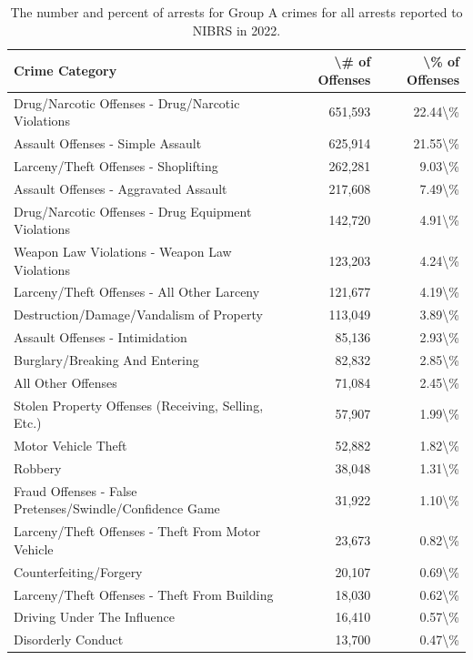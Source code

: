 \documentclass[
  12pt,
  openany]{book}
\begin{document}
\begin{longtable}[t]{lrr}
\caption{\label{tab:arresteeCrime}The number and percent of arrests for Group A crimes for all arrests reported to NIBRS in 2022.}\\
\toprule
Crime Category & \textbackslash{}\# of Offenses & \textbackslash{}\% of Offenses\\
\midrule
Drug/Narcotic Offenses - Drug/Narcotic Violations & 651,593 & 22.44\textbackslash{}\%\\
Assault Offenses - Simple Assault & 625,914 & 21.55\textbackslash{}\%\\
Larceny/Theft Offenses - Shoplifting & 262,281 & 9.03\textbackslash{}\%\\
Assault Offenses - Aggravated Assault & 217,608 & 7.49\textbackslash{}\%\\
Drug/Narcotic Offenses - Drug Equipment Violations & 142,720 & 4.91\textbackslash{}\%\\
\addlinespace
Weapon Law Violations - Weapon Law Violations & 123,203 & 4.24\textbackslash{}\%\\
Larceny/Theft Offenses - All Other Larceny & 121,677 & 4.19\textbackslash{}\%\\
Destruction/Damage/Vandalism of Property & 113,049 & 3.89\textbackslash{}\%\\
Assault Offenses - Intimidation & 85,136 & 2.93\textbackslash{}\%\\
Burglary/Breaking And Entering & 82,832 & 2.85\textbackslash{}\%\\
\addlinespace
All Other Offenses & 71,084 & 2.45\textbackslash{}\%\\
Stolen Property Offenses (Receiving, Selling, Etc.) & 57,907 & 1.99\textbackslash{}\%\\
Motor Vehicle Theft & 52,882 & 1.82\textbackslash{}\%\\
Robbery & 38,048 & 1.31\textbackslash{}\%\\
Fraud Offenses - False Pretenses/Swindle/Confidence Game & 31,922 & 1.10\textbackslash{}\%\\
\addlinespace
Larceny/Theft Offenses - Theft From Motor Vehicle & 23,673 & 0.82\textbackslash{}\%\\
Counterfeiting/Forgery & 20,107 & 0.69\textbackslash{}\%\\
Larceny/Theft Offenses - Theft From Building & 18,030 & 0.62\textbackslash{}\%\\
Driving Under The Influence & 16,410 & 0.57\textbackslash{}\%\\
Disorderly Conduct & 13,700 & 0.47\textbackslash{}\%\\

\end{longtable}
\end{document}
